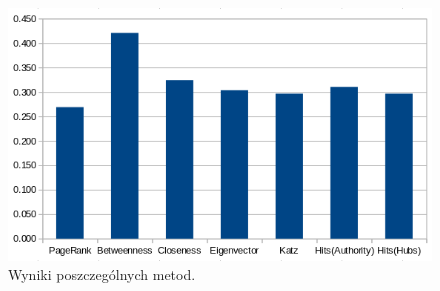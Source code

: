 \begin{figure}[H]
	\centering
		\includegraphics[width=0.75\linewidth]{img/results.png}
	\caption[Wyniki poszczególnych metod.]{Wyniki poszczególnych metod.}
	\label{fig:binary}
\end{figure}
